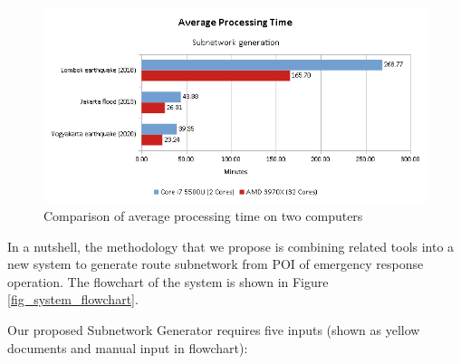 \documentclass[conference]{IEEEtran}
\begin{document}
\begin{figure}
\centerline{\includegraphics[scale=0.5]{average-processing-time-chart.png}}
\caption{Comparison of average processing time on two computers}
\label{fig_average_processing_time_chart}
\end{figure}

In a nutshell, the methodology that we propose is combining related tools into a new system to generate route subnetwork from POI of emergency response operation. The flowchart of the system is shown in Figure \ref{fig_system_flowchart}.

Our proposed Subnetwork Generator requires five inputs (shown as yellow documents and manual input in flowchart):
\end{document}
